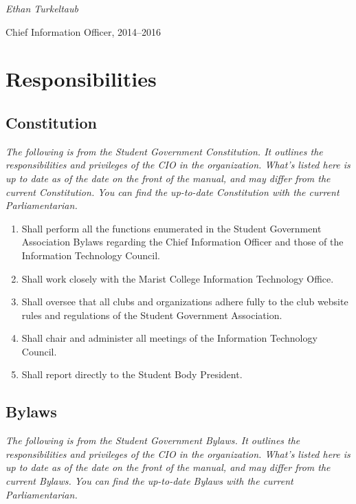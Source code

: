 \documentclass[11pt]{report}
\begin{document}
	\begin{flushright}
		\textit{Ethan Turkeltaub}
		
		Chief Information Officer, 2014--2016
	\end{flushright}

	

\chapter{Responsibilities}
	\section{Constitution}
		\textit{The following is from the Student Government Constitution. It outlines the responsibilities and privileges of the CIO in the organization. What's listed here is up to date as of the date on the front of the manual, and may differ from the current Constitution. You can find the up-to-date Constitution with the current Parliamentarian.}
	
	
		\begin{enumerate}[label=\Alph*.]
			\item{Shall perform all the functions enumerated in the Student Government Association Bylaws regarding the Chief Information Officer and those of the Information Technology Council.}
			\item{Shall work closely with the Marist College Information Technology Office.}
			\item{Shall oversee that all clubs and organizations adhere fully to the club website rules and regulations of the Student Government Association.}
			\item{Shall chair and administer all meetings of the Information Technology Council.}
			\item{Shall report directly to the Student Body President.}
		\end{enumerate}


	\section{Bylaws}
		\textit{The following is from the Student Government Bylaws. It outlines the responsibilities and privileges of the CIO in the organization. What's listed here is up to date as of the date on the front of the manual, and may differ from the current Bylaws. You can find the up-to-date Bylaws with the current Parliamentarian.}
	
\end{document}
